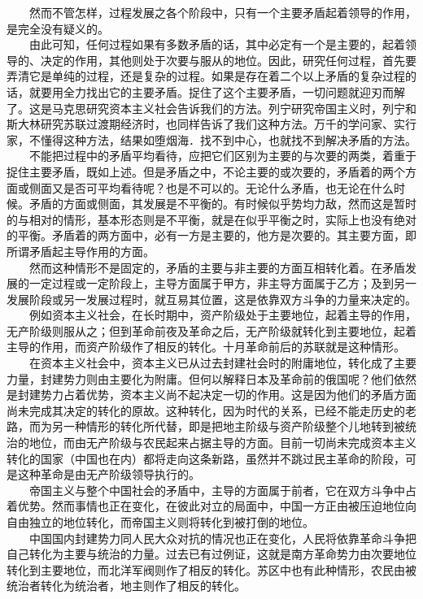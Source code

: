 \documentclass[cn,11pt,chinese]{elegantbook}
\begin{document}
　　然而不管怎样，过程发展之各个阶段中，只有一个主要矛盾起着领导的作用，是完全没有疑义的。\\
　　由此可知，任何过程如果有多数矛盾的话，其中必定有一个是主要的，起着领导的、决定的作用，其他则处于次要与服从的地位。因此，研究任何过程，首先要弄清它是单纯的过程，还是复杂的过程。如果是存在着二个以上矛盾的复杂过程的话，就要用全力找出它的主要矛盾。捉住了这个主要矛盾，一切问题就迎刃而解了。这是马克思研究资本主义社会告诉我们的方法。列宁研究帝国主义时，列宁和斯大林研究苏联过渡期经济时，也同样告诉了我们这种方法。万千的学问家、实行家，不懂得这种方法，结果如堕烟海．找不到中心，也就找不到解决矛盾的方法。\\
　　不能把过程中的矛盾平均看待，应把它们区别为主要的与次要的两类，着重于捉住主要矛盾，既如上述。但是矛盾之中，不论主要的或次要的，矛盾着的两个方面或侧面又是否可平均看待呢？也是不可以的。无论什么矛盾，也无论在什么时候。矛盾的方面或侧面，其发展是不平衡的。有时候似乎势均力敌，然而这是暂时的与相对的情形，基本形态则是不平衡，就是在似乎平衡之时，实际上也没有绝对的平衡。矛盾着的两方面中，必有一方是主要的，他方是次要的。其主要方面，即所谓矛盾起主导作用的方面。\\
　　然而这种情形不是固定的，矛盾的主要与非主要的方面互相转化着。在矛盾发展的一定过程或一定阶段上，主导方面属于甲方，非主导方面属于乙方；及到另一发展阶段或另一发展过程时，就互易其位置，这是依靠双方斗争的力量来决定的。\\
　　例如资本主义社会，在长时期中，资产阶级处于主要地位，起着主导的作用，无产阶级则服从之；但到革命前夜及革命之后，无产阶级就转化到主要地位，起着主导的作用，而资产阶级作了相反的转化。十月革命前后的苏联就是这种情形。\\
　　在资本主义社会中，资本主义已从过去封建社会时的附庸地位，转化成了主要力量，封建势力则由主要化为附庸。但何以解释日本及革命前的俄国呢？他们依然是封建势力占着优势，资本主义尚不起决定一切的作用。这是因为他们的矛盾方面尚未完成其决定的转化的原故。这种转化，因为时代的关系，已经不能走历史的老路，而为另一种情形的转化所代替，即是把地主阶级与资产阶级整个儿地转到被统治的地位，而由无产阶级与农民起来占据主导的方面。目前一切尚未完成资本主义转化的国家（中国也在内）都将走向这条新路，虽然并不跳过民主革命的阶段，可是这种革命是由无产阶级领导执行的。\\
　　帝国主义与整个中国社会的矛盾中，主导的方面属于前者，它在双方斗争中占着优势。然而事情也正在变化，在彼此对立的局面中，中国一方正由被压迫地位向自由独立的地位转化，而帝国主义则将转化到被打倒的地位。\\
　　中国国内封建势力同人民大众对抗的情况也正在变化，人民将依靠革命斗争把自己转化为主要与统治的力量。过去已有过例证，这就是南方革命势力由次要地位转化到主要地位，而北洋军阀则作了相反的转化。苏区中也有此种情形，农民由被统治者转化为统治者，地主则作了相反的转化。\\
\end{document}
